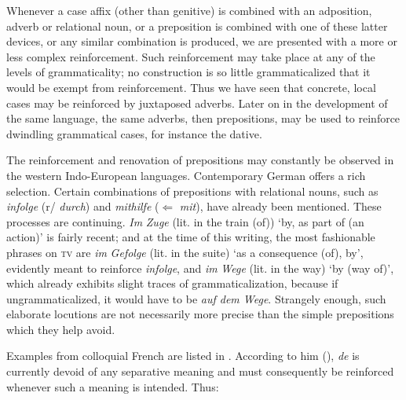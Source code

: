 Whenever a case affix (other than genitive) is combined with an adposition, adverb or relational noun, or a preposition is combined with one of these latter devices, or any similar combination is produced, we are presented with a more or less complex reinforcement. Such reinforcement may take place at any of the levels of grammaticality; no construction is so little grammaticalized that it would be exempt from reinforcement. Thus we have seen that concrete, local cases may be reinforced by juxtaposed adverbs. Later on in the development of the same language, the same adverbs, then prepositions, may be used to reinforce dwindling grammatical cases, for instance the dative.

The reinforcement and renovation of prepositions may constantly be observed in the western Indo-European languages. Contemporary German offers a rich selection. Certain combinations of prepositions with relational nouns, such as \textit{infolge} (r/ \textit{durch}) and \textit{mithilfe} ($\Leftarrow $ \textit{mit}), have already been mentioned. These processes are continuing. \textit{Im} \textit{Zuge} (lit. in the train (of)) ‘by, as part of (an action)’ is fairly recent; and at the time of this writing, the most fashionable phrases on \textsc{tv} are \textit{im} \textit{Gefolge} (lit. in the suite) ‘as a consequence (of), by’, evidently meant to reinforce \textit{infolge}, and \textit{im} \textit{Wege} (lit. in the way) ‘by (way of)’, which already exhibits slight traces of grammaticalization, because if ungrammaticalized, it would have to be \textit{auf dem Wege}. Strangely enough, such elaborate locutions are not necessarily more precise than the simple prepositions which they help avoid.

Examples from colloquial French are listed in \citealt{Frei1929}. According to him (\citeyear[72f]{Frei1929}), \textit{de} is currently devoid of any separative meaning and must consequently be reinforced whenever such a meaning is intended. Thus:


